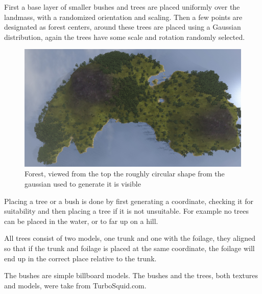 First a base layer of smaller bushes and trees are placed uniformly over the landmass, with a randomized orientation and scaling. Then a few points are designated as forest centers, around these trees are placed using a Gaussian distribution, again the trees have some scale and rotation randomly selected.
\begin{figure}[H]
  \centering
  \includegraphics[width=0.9\linewidth]{images/forestfromthetop.jpg}
  \caption{Forest, viewed from the top the roughly circular shape from the gaussian used to generate it is visible}
  \label{fig:gaussainForest}
\end{figure}

Placing a tree or a bush is done by first generating a coordinate, checking it for suitability and then placing a tree if it is not unsuitable.
For example no trees can be placed in the water, or to far up on a hill.

All trees consist of two models, one trunk and one with the foilage, they aligned so that if the trunk and foilage is placed at the same coordinate, the foilage will end up in the correct place relative to the trunk.

The bushes are simple billboard models. The bushes and the trees, both textures and models, were take from TurboSquid.com.

